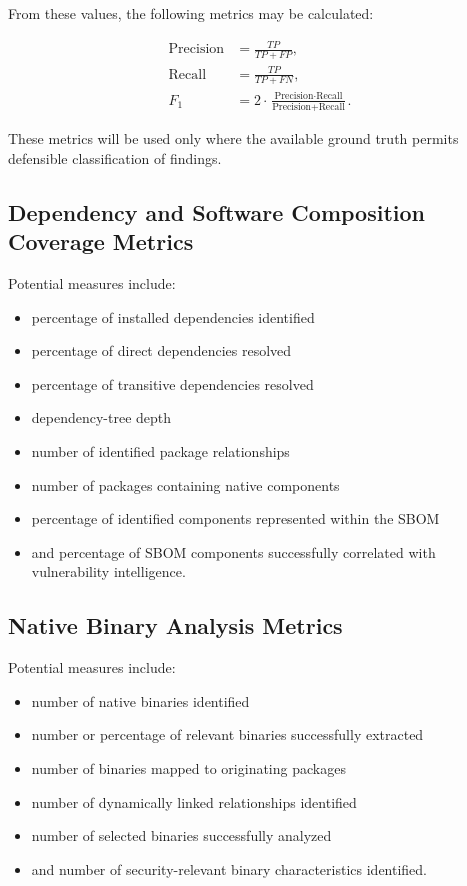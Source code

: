 \documentclass[
  12pt,
  letterpaper,
  oneside]{report}
\providecommand{\tightlist}{%
  \setlength{\itemsep}{0pt}\setlength{\parskip}{0pt}}
\begin{document}
From these values, the following metrics may be calculated:

\begin{align*}
\text{Precision} &= \frac{TP}{TP + FP}, \\
\text{Recall} &= \frac{TP}{TP + FN}, \\
F_1 &= 2 \cdot
  \frac{\text{Precision} \cdot \text{Recall}}
       {\text{Precision} + \text{Recall}}.
\end{align*}

These metrics will be used only where the available ground truth permits
defensible classification of findings.

\subsection{Dependency and Software Composition Coverage Metrics}\label{1152-dependency-and-software-composition-coverage-metrics}

Potential measures include:

\begin{itemize}
\tightlist
\item
  percentage of installed dependencies identified
\item
  percentage of direct dependencies resolved
\item
  percentage of transitive dependencies resolved
\item
  dependency-tree depth
\item
  number of identified package relationships
\item
  number of packages containing native components
\item
  percentage of identified components represented within the SBOM
\item
  and percentage of SBOM components successfully correlated with
  vulnerability intelligence.
\end{itemize}

\subsection{Native Binary Analysis Metrics}\label{1153-native-binary-analysis-metrics}

Potential measures include:

\begin{itemize}
\tightlist
\item
  number of native binaries identified
\item
  number or percentage of relevant binaries successfully extracted
\item
  number of binaries mapped to originating packages
\item
  number of dynamically linked relationships identified
\item
  number of selected binaries successfully analyzed
\item
  and number of security-relevant binary characteristics identified.
\end{itemize}
\end{document}
